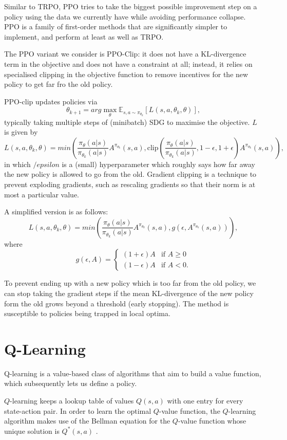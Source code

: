 \documentclass{article}
\begin{document}
Similar to TRPO, PPO tries to take the biggest possible improvement step on a policy using the data we currently have while avoiding performance collapse. PPO is a family of first-order methods that are significantly simpler to implement, and perform at least as well as TRPO.

The PPO variant we consider is PPO-Clip: it does not have a KL-divergence term in the objective and does not have a constraint at all; instead, it relies on specialised clipping in the objective function to remove incentives for the new policy to get far fro the old policy.

PPO-clip updates policies via $$\theta_{k+1} = arg \max_\theta \mathbb{E}_{s,a \sim \pi_{\theta_k}} \left[ L(s,a,\theta_k,\theta) \right],$$ typically taking multiple steps of (minibatch) SDG to maximise the objective. $L$ is given by $$L(s,a,\theta_k,\theta) = min \left(\frac{\pi_\theta(a|s)}{\pi_{\theta_k}(a|s)} A^{\pi_{\theta_k}}(s,a), \text{clip} \left( \frac{\pi_\theta(a|s)}{\pi_{\theta_k}(a|s)}, 1 - \epsilon, 1 + \epsilon \right) A^{\pi_{\theta_k}}(s,a) \right),$$ in which $/epsilon$ is a (small) hyperparameter which roughly says how far away the new policy is allowed to go from the old. Gradient clipping is a technique to prevent exploding gradients, such as rescaling gradients so that their norm is at most a particular value. 

A simplified version is as follows: $$L(s,a,\theta_k,\theta) = min \left( \frac{\pi_\theta(a|s)}{\pi_{\theta_k}(a|s)} A^{\pi_{\theta_k}}(s,a), g(\epsilon, A^{\pi_{\theta_k}}(s,a)) \right),$$ where $$g(\epsilon, A) = \begin{cases} (1+\epsilon)A & \mbox{if } A \geq 0 \\ (1-\epsilon)A & \mbox{if } A < 0. \end{cases}$$

To prevent ending up with a new policy which is too far from the old policy, we can stop taking the gradient steps if the mean KL-divergence of the new policy form the old grows beyond a threshold (early stopping). The method is susceptible to policies being trapped in local optima.

\section{Q-Learning}
Q-learning is a value-based class of algorithms that aim to build a value function, which subsequently lets us define a policy.

$Q$-learning keeps a lookup table of values $Q(s,a)$ with one entry for every state-action pair. In order to learn the optimal $Q$-value function, the $Q$-learning algorithm makes use of the Bellman equation for the $Q$-value function whose unique solution is $Q^*(s,a)$ \cite{DBLP:journals/corr/abs-1811-12560}.
\end{document}
